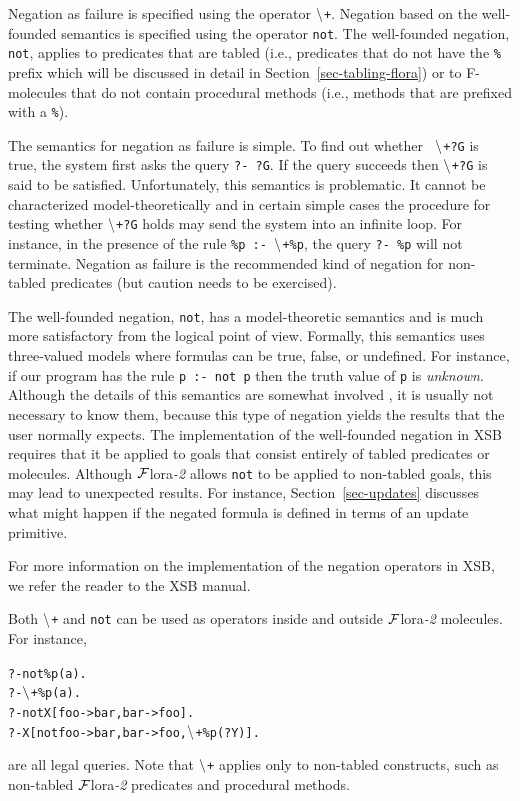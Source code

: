 \documentclass[11pt]{article}
\newcommand{\FLORA}{{\mbox{\sc ${\cal F}${lora}\rm\emph{-2}}}\xspace}
\newcommand{\NAF}{\mbox{\tt \ensuremath{\tt\backslash}+}\xspace}
\newcommand{\TNOT}{{{\tt not}}\xspace}
\begin{document}
Negation as failure is specified using the operator \NAF.
Negation based on the well-founded semantics is specified using the
operator \TNOT.  The well-founded negation, \TNOT, applies to predicates
that are tabled (i.e., predicates that do not have the {\tt \%} prefix
which will be discussed in detail in Section~\ref{sec-tabling-flora}) or
to F-molecules that do not contain procedural methods (i.e., methods that
are prefixed with a {\tt \%}).

The semantics for negation as failure is simple. To find out whether {\tt
  \NAF ?G} is true, the system first asks the query {\tt ?- ?G}. If the query
succeeds then {\tt \NAF ?G} is said to be satisfied. Unfortunately, this
semantics is problematic. It cannot be characterized model-theoretically
and in certain simple cases the procedure for testing whether {\tt \NAF ?G}
holds may send the system into an infinite loop. For instance, in the
presence of the rule {\tt \%p :- \NAF \%p}, the query {\tt ?- \%p} will not
terminate.  Negation as failure is the recommended kind of negation for
non-tabled predicates (but caution needs to be exercised).

The well-founded negation, \TNOT, has a model-theoretic semantics and is
much more
satisfactory from the logical point of view.
Formally, this semantics uses three-valued models where formulas can be
true, false, or undefined. For instance, if our program has the rule
{\tt p :- \TNOT p} then the truth value of {\tt p} is \emph{unknown}.  
Although the details of this
semantics are somewhat involved \cite{gelder-ross-schlipf-91}, it is
usually not necessary to know them, because this type of negation yields
the results that the user normally expects. The implementation of
the well-founded negation in XSB requires that it be applied to goals that
consist entirely of tabled predicates or molecules.
Although \FLORA allows \TNOT to be applied to non-tabled goals,
this may lead to unexpected results.  For instance, 
Section~\ref{sec-updates} discusses what might happen if the
negated formula is defined in terms of an update primitive.

For more information on the implementation of the negation operators in
XSB, we refer the reader to the XSB manual.

Both \NAF and \TNOT can be used as operators inside and outside \FLORA
molecules. For instance,
\begin{alltt}
       ?- \TNOT \%p(a).
       ?- \NAF \%p(a).
       ?- \TNOT X[foo->bar, bar->foo].
       ?- X[\TNOT foo->bar, bar->foo, \NAF \%p(?Y)].
\end{alltt}
are all legal queries. Note that \NAF applies only to non-tabled
constructs, such as non-tabled \FLORA predicates and procedural methods.
\end{document}
